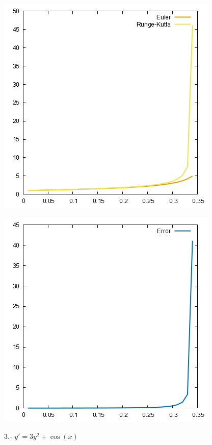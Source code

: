 \documentclass[10pt]{article}
\begin{document}
\begin{multicols}{2}
\begin{center}
				\includegraphics[scale=0.4]{../Graficas/2.png}
			\end{center}
			\begin{center}
				\includegraphics[scale=0.4]{../Graficas/2_1.png}
			\end{center}
			3.- $y'=3y^2+\cos(x)$
			\begin{center}

\end{center}
\end{multicols}
\end{document}
